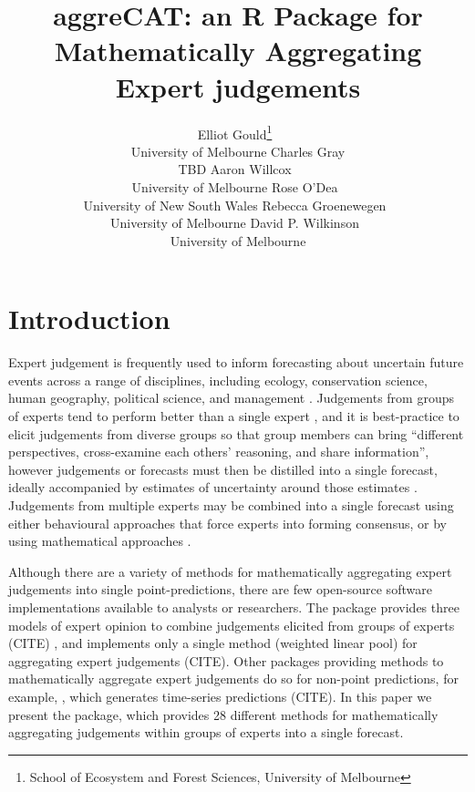 \documentclass[article]{jss}
\author{Elliot
Gould\footnote{School of Ecosystem and Forest Sciences, University of
  Melbourne}~\orcidlink{0000-0002-6585-538X}\\University of
Melbourne \And Charles Gray\\TBD \AND Aaron
Willcox~\orcidlink{https://orcid.org/0000-0003-2536-2596}\\University of
Melbourne \And Rose O'Dea~\orcidlink{0000-0001-8177-5075}\\University of
New South Wales \AND Rebecca
Groenewegen~\orcidlink{https://orcid.org/0000-0001-9177-8536}\\University
of Melbourne \And David P.
Wilkinson~\orcidlink{0000-0002-9560-6499}\\University of Melbourne}
\title{aggreCAT: an R Package for Mathematically Aggregating Expert
judgements}
\begin{document}
\maketitle
\ifdefined\Shaded\renewenvironment{Shaded}{\begin{tcolorbox}[borderline west={3pt}{0pt}{shadecolor}, breakable, enhanced, sharp corners, frame hidden, boxrule=0pt, interior hidden]}{\end{tcolorbox}}\fi

\hypertarget{sec-introduction}{%
\section{Introduction}\label{sec-introduction}}

Expert judgement is frequently used to inform forecasting about
uncertain future events across a range of disciplines, including
ecology, conservation science, human geography, political science, and
management \citep{Sutherland2018}. Judgements from groups of experts
tend to perform better than a single expert \citep{Goossens2008}, and it
is best-practice to elicit judgements from diverse groups so that group
members can bring ``different perspectives, cross-examine each others'
reasoning, and share information'', however judgements or forecasts must
then be distilled into a single forecast, ideally accompanied by
estimates of uncertainty around those estimates \citep{Hanea2021}.
Judgements from multiple experts may be combined into a single forecast
using either behavioural approaches that force experts into forming
consensus, or by using mathematical approaches \citep{Goossens2008}.

Although there are a variety of methods for mathematically aggregating
expert judgements into single point-predictions, there are few
open-source software implementations available to analysts or
researchers. The  \citet{R} package provides
three models of expert opinion to combine judgements elicited from
groups of experts (CITE) , and  implements only a single
method (weighted linear pool) for aggregating expert judgements (CITE).
Other  packages providing methods to mathematically
aggregate expert judgements do so for non-point predictions, for
example, , which generates time-series predictions (CITE). In
this paper we present the  package, which provides 28
different methods for mathematically aggregating judgements within
groups of experts into a single forecast.
\end{document}

